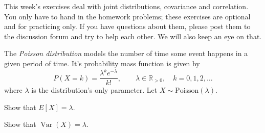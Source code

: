 \documentclass[a4paper,10pt,landscape,twocolumn]{scrartcl}
\DeclareMathOperator{\Var}{Var}
\begin{document}
\practiceproblems

{\sffamily\noindent
This week's exercises deal with joint distributions, covariance and correlation. You only have to hand in the homework problems; these exercises are optional and for practicing only. If you have questions about them, please post them to the discussion forum and try to help each other. We will also keep an eye on that.
}



\begin{exercise}
	The \emph{Poisson distribution} 	models the number of time some event happens in a given period of time. It's probability mass function is given by
	\[
	P(X = k) = {\frac {\lambda ^{k}e^{-\lambda }}{k!}}, \qquad \lambda \in \mathbb{R}_{>0}, \quad k=0,1,2,\dots
	\]
	where $\lambda$ is the distribution's only parameter. Let $X\sim \text{Poisson}(\lambda)$.
	
	\begin{subex}
		Show that $E[X] = \lambda$.
	\end{subex}
	
	\begin{subex}
		Show that $\Var(X) = \lambda$.
	\end{subex}

\end{exercise}
\end{document}
